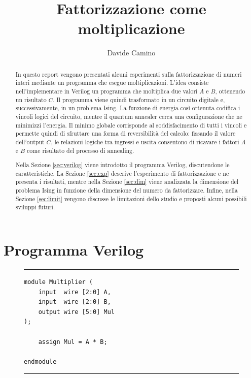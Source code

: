 \documentclass[]{article}
\title{Fattorizzazione come moltiplicazione \say{Reversed}}
\author{Davide Camino}
\begin{document}
	
	\maketitle
	
	\begin{abstract}
		In questo report vengono presentati alcuni esperimenti sulla fattorizzazione di numeri interi mediante un programma che esegue moltiplicazioni. L'idea consiste nell'implementare in Verilog un programma che moltiplica due valori $A$ e $B$, ottenendo un risultato $C$. Il programma viene quindi trasformato in un circuito digitale e, successivamente, in un problema Ising. La funzione di energia così ottenuta codifica i vincoli logici del circuito, mentre il quantum annealer cerca una configurazione che ne minimizzi l'energia. Il minimo globale corrisponde al soddisfacimento di tutti i vincoli e permette quindi di sfruttare una forma di reversibilità del calcolo: fissando il valore dell'output $C$, le relazioni logiche tra ingressi e uscita consentono di ricavare i fattori $A$ e $B$ come risultato del processo di annealing.
		
		
		Nella Sezione \ref{sec:verilog} viene introdotto il programma Verilog, discutendone le caratteristiche. La Sezione \ref{sec:exp} descrive l'esperimento di fattorizzazione e ne presenta i risultati, mentre nella Sezione \ref{sec:dim} viene analizzata la dimensione del problema Ising in funzione della dimensione del numero da fattorizzare. Infine, nella Sezione \ref{sec:limit} vengono discusse le limitazioni dello studio e proposti alcuni possibili sviluppi futuri.
	\end{abstract}
	
	\section{Programma Verilog}
	\label{sec:verilog}
	
	\begin{figure}
		\rule{\linewidth}{0.4pt}
		
		\hfill
		\begin{minipage}{.9\linewidth}
			\vspace{.2cm}
			\begin{verbatim}
module Multiplier (
	input  wire [2:0] A,
	input  wire [2:0] B,
	output wire [5:0] Mul
);

	assign Mul = A * B;

endmodule
			\end{verbatim}
			\vspace{-.1cm}
		\end{minipage}
		\rule{\linewidth}{0.4pt}
		\label{lst:mult_verilog}
	\end{figure}
	
\end{document}
